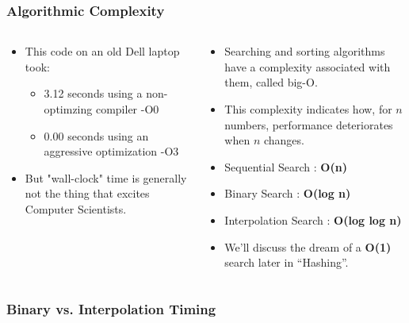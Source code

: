 \begin{frame}[fragile]
\frametitle{Algorithmic Complexity}
\begin{columns}[T]

\begin{column}{0.55\textwidth}

\begin{itemize}
\item This code on an old Dell laptop took:
\begin{itemize}
\item 3.12 seconds using a non-optimzing compiler -O0
\item 0.00 seconds using an aggressive optimization -O3
\end{itemize}
\item But "wall-clock" time is generally not the thing that excites Computer Scientists.
\end{itemize}
\end{column}

\pause
\begin{column}{0.35\textwidth}
\begin{itemize}
\item Searching and sorting algorithms have a complexity associated with them, called big-O.
\item This complexity indicates how, for $n$ numbers, performance deteriorates when $n$ changes.
\item Sequential Search : {\bf O(n)}
\item Binary Search : {\bf O(log n)}
\item Interpolation Search : {\bf O(log log n)}
\item We'll discuss the dream of a {\bf O(1)} search later in ``Hashing''.
\end{itemize}
\end{column}


\end{columns}
\end{frame}


\begin{frame}[fragile]
\frametitle{Binary vs. Interpolation Timing}
\begin{columns}[T]

\begin{column}{0.55\textwidth}

\end{column}

\pause
\begin{column}{0.35\textwidth}
\end{column}

\end{columns}
\end{frame}

